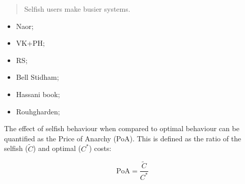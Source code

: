 \documentclass[12pt]{article}
\newcommand{\PoA}{\text{PoA}}
\begin{document}
\begin{quote}
Selfish users make busier systems.
\end{quote}

\begin{itemize}
    \item Naor;
    \item VK+PH;
    \item RS;
    \item Bell Stidham;
    \item Hassani book;
    \item Rouhgharden;
\end{itemize}

The effect of selfish behaviour when compared to optimal behaviour can be quantified as the Price of Anarchy (PoA).
This is defined as the ratio of the selfish ($\tilde C$) and optimal ($C^*$) costs:

$$
\PoA = \frac{\tilde C}{C^*}
$$
\end{document}
